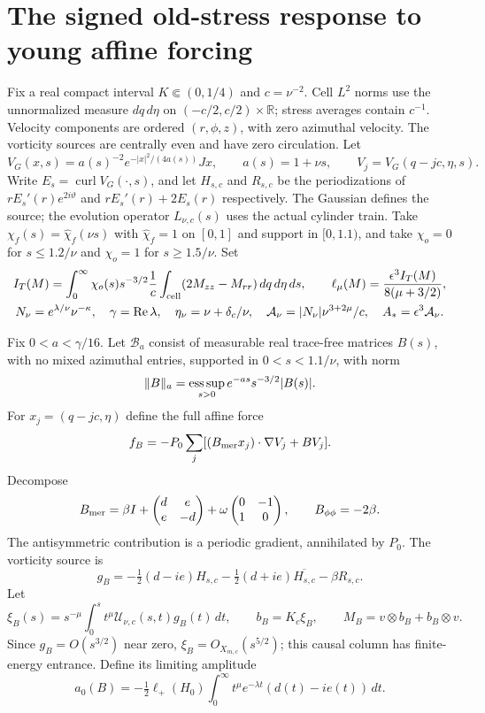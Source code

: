 \section{The signed old-stress response to young affine forcing}

Fix a real compact interval $K\Subset(0,1/4)$ and $c=\nu^{-2}$.
Cell $L^2$ norms use the unnormalized measure $dq\,d\eta$ on
$(-c/2,c/2)\times\mathbb R$; stress averages contain $c^{-1}$.
Velocity components are ordered $(r,\phi,z)$, with zero azimuthal velocity.
The vorticity sources are centrally even and have zero circulation.
Let
\[
 V_G(x,s)=a(s)^{-2}e^{-|x|^2/(4a(s))}Jx,\qquad a(s)=1+\nu s,
 \qquad V_j=V_G(q-jc,\eta,s).
\]
Write $E_s=\operatorname{curl}V_G(\cdot,s)$, and let $H_{s,c}$ and
$R_{s,c}$ be the periodizations of $rE_s'(r)e^{2i\vartheta}$ and
$rE_s'(r)+2E_s(r)$ respectively. The Gaussian defines the source;
the evolution operator $L_{\nu,c}(s)$ uses the actual cylinder train.
Take $\chi_f(s)=\widehat\chi_f(\nu s)$ with $\widehat\chi_f=1$ on
$[0,1]$ and support in $[0,1.1)$, and take $\chi_o=0$ for
$s\le1.2/\nu$ and $\chi_o=1$ for $s\ge1.5/\nu$. Set
\[
\begin{gathered}
 I_T(M)=\int_0^\infty\chi_o(s)s^{-3/2}
       \frac1c\int_{\rm cell}(2M_{zz}-M_{rr})\,dq\,d\eta\,ds,
 \qquad \ell_\mu(M)=\frac{\epsilon^3I_T(M)}{8(\mu+3/2)},\\
 N_\nu=e^{\lambda/\nu}\nu^{-\kappa},\quad
 \gamma=\operatorname{Re}\lambda,\quad \eta_\nu=\nu+\delta_c/\nu,
 \quad \mathcal A_\nu=|N_\nu|\nu^{3+2\mu}/c,\quad
 A_*=\epsilon^3\mathcal A_\nu.
\end{gathered}
\]

Fix $0<a<\gamma/16$. Let $\mathscr B_a$ consist of measurable real
trace-free matrices $B(s)$, with no mixed azimuthal entries, supported
in $0<s<1.1/\nu$, with norm
\[
 \|B\|_a=\mathop{\rm ess\,sup}_{s>0}e^{-as}s^{-3/2}|B(s)|.
\]
For $x_j=(q-jc,\eta)$ define the full affine force
\[
 f_B=-P_0\sum_j[(B_{\rm mer}x_j)\cdot\nabla V_j+B V_j].
\]
Decompose
\[
 B_{\rm mer}=\beta I+\begin{pmatrix}d&e\\e&-d\end{pmatrix}
       +\omega\begin{pmatrix}0&-1\\1&0\end{pmatrix},
 \qquad B_{\phi\phi}=-2\beta.
\]
The antisymmetric contribution is a periodic gradient, annihilated
by $P_0$. The vorticity source is
\[
 g_B=-\tfrac12(d-ie)H_{s,c}-\tfrac12(d+ie)\overline{H_{s,c}}
          -\beta R_{s,c}.
\]
Let
\[
 \xi_B(s)=s^{-\mu}\int_0^s t^\mu\mathcal U_{\nu,c}(s,t)g_B(t)\,dt,
 \qquad b_B=K_c\xi_B,\qquad M_B=v\otimes b_B+b_B\otimes v.
\]
Since $g_B=O(s^{3/2})$ near zero, $\xi_B=O_{X_{m,c}}(s^{5/2})$;
this causal column has finite-energy entrance. Define its limiting amplitude
\[
 a_0(B)=-\tfrac12\ell_+(H_0)
              \int_0^\infty t^\mu e^{-\lambda t}(d(t)-ie(t))\,dt.
\]

